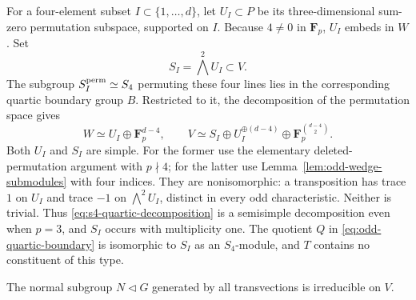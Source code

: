 For a four-element subset $I\subset\{1,\ldots,d\}$, let
$U_I\subset P$ be its three-dimensional sum-zero permutation
subspace, supported on $I$.  Because $4\ne0$ in $\mathbf F_p$,
$U_I$ embeds in $W$.  Set
\[
 S_I=\bigwedge^2 U_I\subset V.
\]
The subgroup $S_I^{\rm perm}\simeq S_4$ permuting these four lines
lies in the corresponding quartic boundary group $B$.  Restricted
to it, the decomposition of the permutation space gives
\begin{equation}\label{eq:s4-quartic-decomposition}
 W\simeq U_I\oplus\mathbf F_p^{d-4},\qquad
 V\simeq S_I\oplus U_I^{\oplus(d-4)}
             \oplus\mathbf F_p^{\binom{d-4}{2}}.
\end{equation}
Both $U_I$ and $S_I$ are simple.  For the former use the elementary
deleted-permutation argument with $p\nmid4$; for the latter use
Lemma~\ref{lem:odd-wedge-submodules} with four indices.  They are
nonisomorphic: a transposition has trace $1$ on $U_I$ and trace $-1$
on $\bigwedge^2U_I$, distinct in every odd characteristic.  Neither
is trivial.  Thus \eqref{eq:s4-quartic-decomposition} is a semisimple
decomposition even when $p=3$, and $S_I$ occurs with multiplicity one.
The quotient $Q$ in \eqref{eq:odd-quartic-boundary} is isomorphic to
$S_I$ as an $S_4$-module, and $T$ contains no constituent of this type.

\begin{proposition}\label{prop:odd-transvection-normal-irreducible}
The normal subgroup $N\triangleleft G$ generated by all transvections
is irreducible on $V$.
\end{proposition}

